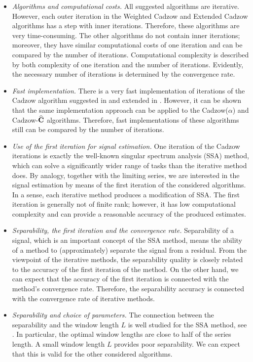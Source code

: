 \documentclass[sii]{ipart}
\begin{document}
\begin{itemize}
		\item \textit{Algorithms and computational costs.}
		All suggested algorithms are iterative. However, each outer iteration in the Weighted Cadzow and Extended Cadzow algorithms has a step with inner iterations. Therefore, these algorithms are very time-consuming. The other algorithms do not contain inner iterations; moreover, they have similar computational costs of one iteration and can be compared by the number of iterations.
		Computational complexity is described by both complexity of one iteration and the number of iterations. Evidently, the necessary number of iterations is determined by the convergence rate.
\item \textit{Fast implementation.}
There is a very fast implementation of iterations of the Cadzow algorithm suggested in \cite{Korobeynikov2010} and extended in \cite{Golyandina.etal2015}. However, it can be shown that the same implementation approach can be applied to the Cadzow($\alpha$) and Cadzow-$\widehat{\mathbf{C}}$ algorithms. Therefore, fast implementations of these algorithms still can be compared by the number of iterations.
		\item \textit{Use of the first iteration for signal estimation.}
		One iteration of the Cadzow iterations is exactly the well-known singular spectrum analysis (SSA) method, which can solve a significantly wider range of tasks than the iterative method does. By analogy, together with the limiting series, we are interested in the signal estimation by means of the first iteration of the considered algorithms. In a sense, each iterative method produces a modification of SSA. The first iteration is generally not of finite rank; however, it has low computational complexity and can provide a reasonable accuracy of the produced estimates.
		\item \textit{Separability, the first iteration and the convergence rate.}
		Separability of a signal, which is an important concept of the SSA method, means the ability of a method to (approximately) separate the signal from a residual. From the viewpoint of the iterative methods,  the separability quality is closely related to the accuracy of the first iteration of the method. On the other hand, we can expect that the accuracy of the first iteration is connected with the method's convergence rate. Therefore, the separability accuracy is connected with the convergence rate of iterative methods.
		\item \textit{Separability and choice of parameters.}
		The connection between the separability and the window length $L$ is well studied for the SSA method, see \cite{Golyandina2010}. In particular, the optimal window lengths are close to half of the series length. A small window length $L$ provides poor separability. We can expect that this is valid for the other considered algorithms.

\end{itemize}
\end{document}
